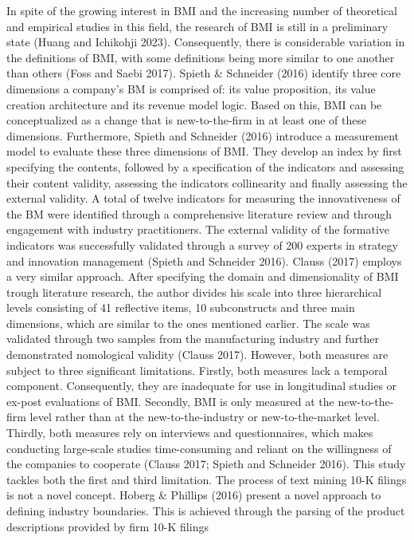 \documentclass[
]{article}
\begin{document}
In spite of the growing interest in BMI and the increasing number of
theoretical and empirical studies in this field, the research of BMI is
still in a preliminary state (Huang and Ichikohji 2023). Consequently,
there is considerable variation in the definitions of BMI, with some
definitions being more similar to one another than others (Foss and
Saebi 2017). Spieth \& Schneider (2016) identify three core dimensions a
company's BM is comprised of: its value proposition, its value creation
architecture and its revenue model logic. Based on this, BMI can be
conceptualized as a change that is new-to-the-firm in at least one of
these dimensions. Furthermore, Spieth and Schneider (2016) introduce a
measurement model to evaluate these three dimensions of BMI. They
develop an index by first specifying the contents, followed by a
specification of the indicators and assessing their content validity,
assessing the indicators collinearity and finally assessing the external
validity. A total of twelve indicators for measuring the innovativeness
of the BM were identified through a comprehensive literature review and
through engagement with industry practitioners. The external validity of
the formative indicators was successfully validated through a survey of
200 experts in strategy and innovation management (Spieth and Schneider
2016). Clauss (2017) employs a very similar approach. After specifying
the domain and dimensionality of BMI trough literature research, the
author divides his scale into three hierarchical levels consisting of 41
reflective items, 10 subconstructs and three main dimensions, which are
similar to the ones mentioned earlier. The scale was validated through
two samples from the manufacturing industry and further demonstrated
nomological validity (Clauss 2017). However, both measures are subject
to three significant limitations. Firstly, both measures lack a temporal
component. Consequently, they are inadequate for use in longitudinal
studies or ex-post evaluations of BMI. Secondly, BMI is only measured at
the new-to-the-firm level rather than at the new-to-the-industry or
new-to-the-market level. Thirdly, both measures rely on interviews and
questionnaires, which makes conducting large-scale studies
time-consuming and reliant on the willingness of the companies to
cooperate (Clauss 2017; Spieth and Schneider 2016). This study tackles
both the first and third limitation. The process of text mining 10-K
filings is not a novel concept. Hoberg \& Phillips (2016) present a
novel approach to defining industry boundaries. This is achieved through
the parsing of the product descriptions provided by firm 10-K filings
\end{document}
